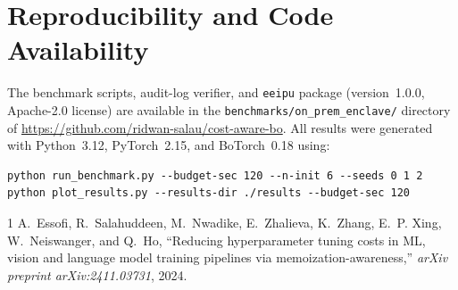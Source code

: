 \documentclass[11pt,letterpaper]{article}
\begin{document}
\section{Reproducibility and Code Availability}
The benchmark scripts, audit-log verifier, and \texttt{eeipu} package (version~1.0.0, Apache-2.0 license) are available in the \texttt{benchmarks/on\_prem\_enclave/} directory of \url{https://github.com/ridwan-salau/cost-aware-bo}. All results were generated with Python~3.12, PyTorch~2.15, and BoTorch~0.18 using:
\begin{verbatim}
python run_benchmark.py --budget-sec 120 --n-init 6 --seeds 0 1 2
python plot_results.py --results-dir ./results --budget-sec 120
\end{verbatim}

\begin{thebibliography}{1}
A.~Essofi, R.~Salahuddeen, M.~Nwadike, E.~Zhalieva, K.~Zhang, E.~P. Xing, W.~Neiswanger, and Q.~Ho,
``Reducing hyperparameter tuning costs in ML, vision and language model training pipelines via memoization-awareness,''
\emph{arXiv preprint arXiv:2411.03731}, 2024.
\end{thebibliography}
\end{document}
